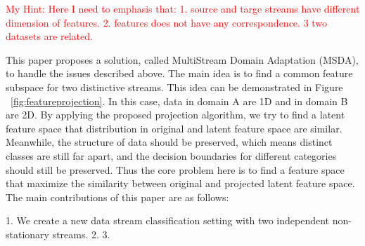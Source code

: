 \textcolor{red}{My Hint: Here I need to emphasis that: 1. source and targe streams have different dimension of features. 2. features does not have any correspondence. 3 two datasets are related.}

This paper proposes a solution, called MultiStream Domain Adaptation (MSDA), to handle the issues described above. The
main idea is to find a common feature subspace for two distinctive streams. This idea can
be demonstrated in Figure ~\ref{fig:featureprojection}. In this case, data in domain A are 1D and in domain B are 2D. By applying the proposed projection algorithm, we
try to find a latent feature space that distribution in original and latent feature space are similar. 
Meanwhile, the structure of data should be preserved, which means distinct classes are still far
apart, and the decision boundaries for different categories should still be preserved.
Thus the core problem here is to find a feature space that maximize the similarity between
original and projected latent feature space. The main contributions of this paper are as follows:

1. We create a new data stream classification setting with two independent non-stationary streams.
2. 
3. 


